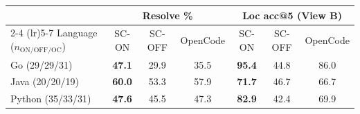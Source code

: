 \begin{tabular}{lcccccc}
\toprule
          & \multicolumn{3}{c}{Resolve \%} & \multicolumn{3}{c}{Loc acc@5 (View B)} \\
\cmidrule(lr){2-4} \cmidrule(lr){5-7}
Language ($n_{\text{ON/OFF/OC}}$)  & SC-ON & SC-OFF & OpenCode & SC-ON & SC-OFF & OpenCode \\
\midrule
Go (29/29/31)     & \textbf{47.1} & 29.9 & 35.5 & \textbf{95.4} & 44.8 & 86.0 \\
Java (20/20/19)   & \textbf{60.0} & 53.3 & 57.9 & \textbf{71.7} & 46.7 & 66.7 \\
Python (35/33/31) & \textbf{47.6} & 45.5 & 47.3 & \textbf{82.9} & 42.4 & 69.9 \\
\bottomrule
\end{tabular}
